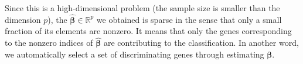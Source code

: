 \documentclass{article}
\numberwithin{equation}{section}
\begin{document}
Since this is a high-dimensional problem (the sample size is smaller than the dimension $p$), the $\hat{\boldsymbol{\beta}}\in\mathbb{R}^p$ we obtained is sparse in the sense that only a small fraction of its elements are nonzero. It means that only the genes corresponding to the nonzero indices of $\hat{\boldsymbol{\beta}}$ are contributing to the classification. In another word, we automatically select a set of discriminating genes through estimating $\boldsymbol{\beta}$.






\end{document}
